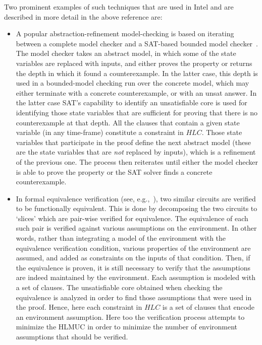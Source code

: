 \documentclass[twoside,11pt]{article}
\begin{document}
Two prominent examples of such techniques that are used in Intel and are
described in more detail in the above reference are:
\begin{itemize}
  \item A popular abstraction-refinement model-checking is based on
      iterating between a complete model checker and a SAT-based bounded
      model checker~\cite{MA03,GGYA03}. The model checker takes an
      abstract model, in which some of the state variables are replaced
      with inputs, and either proves the property or returns the depth in
      which it found a counterexample. In the latter case, this depth is
      used in a bounded-model checking run over the concrete model, which
      may either terminate with a concrete counterexample, or with an
      unsat answer. In the latter case SAT's capability to identify an
      unsatisfiable core is used for identifying those state variables
      that are sufficient for proving that there is no counterexample at
      that depth. All the clauses that contain a given state variable (in
      any time-frame) constitute a constraint in $HLC$. Those state
      variables that participate in the proof define the next abstract
      model (these are the state variables that are \emph{not} replaced
      by inputs), which is a refinement of the previous one. The process
      then reiterates until either the model checker is able to prove the
      property or the SAT solver finds a concrete counterexample.

  \item In formal equivalence verification (see, e.g.,~\cite{KKB09}), two
      similar circuits are verified to be functionally equivalent. This
      is done by decomposing the two circuits to `slices' which are
      pair-wise verified for equivalence. The equivalence of each such
      pair is verified against various assumptions on the environment. In
      other words, rather than integrating a model of the environment
      with the equivalence verification condition, various properties of
      the environment are assumed, and added as constraints on the inputs
      of that condition. Then, if the equivalence is proven, it is still
      necessary to verify that the assumptions are indeed maintained by
      the environment. Each assumption is modeled with a set of clauses.
      The unsatisfiable core obtained when checking the equivalence is
      analyzed in order to find those assumptions that were used in the
      proof. Hence, here each constraint in $HLC$ is a set of clauses that
      encode an environment assumption. Here too the verification process
      attempts to minimize the HLMUC in order to minimize the number of
      environment assumptions that should be verified.
\end{itemize}
\end{document}
